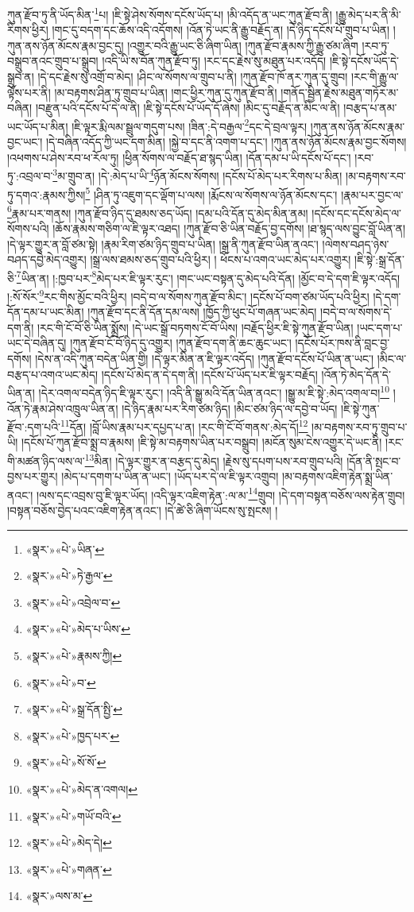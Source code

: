 ཀུན་རྫོབ་ཏུ་ནི་ཡོད་མིན་\footnote{«སྣར་»«པེ་»ཡིན་}པ། །ཇི་སྟེ་ཤེས་སོགས་དངོས་ཡོད་པ། །མི་འདོད་ན་ཡང་ཀུན་རྫོབ་ནི། །རྒྱུ་མེད་པར་ནི་མི་རིགས་ཕྱིར། །གང་དུ་བདག་དང་ཆོས་འདི་འདོགས། །འོན་ཏེ་ཡང་ནི་རྒྱུ་བརྗོད་ན། །དེ་ཉིད་དངོས་པོ་གྲུབ་པ་ཡིན། །ཀུན་ནས་ཉོན་མོངས་རྣམ་བྱང་དུ། །འགྱུར་བའི་རྒྱུ་ཡང་ཅི་ཞིག་ཡིན། །ཀུན་རྫོབ་རྣམས་ཀྱི་རྒྱུ་ཙམ་ཞིག །རབ་ཏུ་བསྒྲུབ་ནའང་གྲུབ་པ་སྒྲུབ། །འདི་ཡི་ས་བོན་ཀུན་རྫོབ་ཏུ། །རང་དང་རྗེས་སུ་མཐུན་པར་འདོད། །ཇི་སྟེ་དངོས་ཡོད་དེ་སྒྲུབ་ན། །དེ་དང་རྗེས་སུ་འགྲོ་བ་མེད། །ཤིང་ལ་སོགས་ལ་གྲུབ་པ་ནི། །ཀུན་རྫོབ་ཁོ་ནར་ཀུན་དུ་གྲུབ། །རང་གི་རྒྱུ་ལ་ལྟོས་པར་ནི། །མ་བརྟགས་ཤིན་ཏུ་གྲུབ་པ་ཡིན། །གང་ཕྱིར་ཀུན་དུ་ཀུན་རྫོབ་ནི། །གནོད་སྦྱིན་རྗེས་མཐུན་གཏོར་མ་བཞིན། །བརྫུན་པའི་དངོས་པོ་དེ་ལ་ནི། །ཇི་སྟེ་དངོས་པོ་ཡོད་དོ་ཞེས། །མིང་དུ་བརྗོད་ན་མིང་ལ་ནི། །བརྩད་པ་ནམ་ཡང་ཡོད་པ་མིན། །ཇི་ལྟར་རྨི་ལམ་སྦྲུལ་གདུག་པས། །ཟིན་:དེ་བརྒྱལ་\footnote{«སྣར་»«པེ་»ཏེ་རྒྱལ་}དང་དེ་བྲལ་ལྟར། །ཀུན་ནས་ཉོན་མོངས་རྣམ་བྱང་ཡང་། །དེ་བཞིན་འདོད་ཀྱི་ཡང་དག་མིན། །སྐྱེ་བ་དང་ནི་འགག་པ་དང་། །ཀུན་ནས་ཉོན་མོངས་རྣམ་བྱང་སོགས། །འཕགས་པ་ཤེས་རབ་ཕ་རོལ་ཏུ། །ཕྱིན་སོགས་ལ་བརྗོད་ཐ་སྙད་ཡིན། །དོན་དམ་པ་ཡི་དངོས་པོ་དང་། །རབ་ཏུ་:འབྲལ་བ་\footnote{«སྣར་»«པེ་»འབྲེལ་བ་}མ་གྲུབ་ན། །དེ་:མེད་པ་ཡི་\footnote{«སྣར་»«པེ་»མེད་པ་ཡིས་}ཉོན་མོངས་སོགས། །དངོས་པོ་མེད་པར་རིགས་པ་མིན། །མ་བརྟགས་རབ་ཏུ་དགའ་:རྣམས་ཀྱིས།\footnote{«སྣར་»«པེ་»རྣམས་ཀྱི།} །ཤིན་ཏུ་འཇུག་དང་ལྡོག་པ་ལས། །རྨོངས་ལ་སོགས་ལ་ཉོན་མོངས་དང་། །རྣམ་པར་བྱང་ལ་\footnote{«སྣར་»«པེ་»བ་}རྣམ་པར་གནས། །ཀུན་རྫོབ་ཉིད་དུ་ཐམས་ཅད་ཡོད། །དམ་པའི་དོན་དུ་མེད་མིན་ནམ། །དངོས་དང་དངོས་མེད་ལ་སོགས་པའི། །ཆོས་རྣམས་གཅིག་ལ་ཇི་ལྟར་འཐད། །ཀུན་རྫོབ་ཅི་ཡིན་བརྗོད་བྱ་དགོས། །ཐ་སྙད་ལས་བྱུང་བློ་ཡིན་ན། །དེ་ལྟར་གྱུར་ན་བློ་ཙམ་སྟེ། །རྣམ་རིག་ཙམ་ཉིད་གྲུབ་པ་ཡིན། །སྒྲ་ནི་ཀུན་རྫོབ་ཡིན་ནའང་། །ལེགས་བཤད་ཉེས་བཤད་དབྱེ་མེད་འགྱུར། །སྒྲ་ལས་ཐམས་ཅད་གྲུབ་པའི་ཕྱིར། །
ཕོངས་པ་འགའ་ཡང་མེད་པར་འགྱུར། །ཇི་སྟེ་:སྒྲ་དོན་ཅི་\footnote{«སྣར་»«པེ་»སྒྲ་དོན་སྤྱི་}ཡིན་ན། །:ཁྱབ་པར་\footnote{«སྣར་»«པེ་»ཁྱད་པར་}མེད་པར་ཇི་ལྟར་རུང་། །གང་ཡང་བསྟན་དུ་མེད་པའི་དོན། །མྱོང་བ་དེ་དག་ཇི་ལྟར་འདོད། །:སོ་སོར་\footnote{«སྣར་»«པེ་»སོ་སོ་}རང་གིས་མྱོང་བའི་ཕྱིར། །བདེ་བ་ལ་སོགས་ཀུན་རྫོབ་མིང་། །དངོས་པོ་བག་ཙམ་ཡོད་པའི་ཕྱིར། །དེ་དག་དོན་དམ་པ་ཡང་མིན། །ཀུན་རྫོབ་དང་ནི་དོན་དམ་ལས། །ཁྱོད་ཀྱི་ཕུང་པོ་གཞན་ཡང་མེད། །བདེ་བ་ལ་སོགས་དེ་དག་ནི། །རང་གི་ངོ་བོ་ཅི་ཡིན་སྨྲོས། །དེ་ཡང་སྒྲོ་བཏགས་ངོ་བོ་ཡིས། །བརྗོད་ཕྱིར་ཇི་སྟེ་ཀུན་རྫོབ་ཡིན། །ཡང་དག་པ་ཡང་དེ་བཞིན་དུ། །ཀུན་རྫོབ་ངོ་བོ་ཉིད་དུ་འགྱུར། །ཀུན་རྫོབ་དག་ནི་ཆང་ཆུང་ཡང་། །དངོས་པོར་ཁས་ནི་བླང་བྱ་དགོས། །དེས་ན་འདི་ཀུན་བདེན་ཡིན་གྱི། །དེ་ལྟར་མིན་ན་ཇི་ལྟར་འདོད། །ཀུན་རྫོབ་དངོས་པོ་ཡིན་ན་ཡང་། །མིང་ལ་བརྩད་པ་འགའ་ཡང་མེད། །དངོས་པོ་མེད་ན་དེ་དག་ནི། །དངོས་པོ་ཡོད་པར་ཇི་ལྟར་བརྗོད། །འོན་ཏེ་མེད་དོན་དེ་ཡིན་ན། །དེར་འགལ་བདེན་ཉིད་ཇི་ལྟར་རུང་། །འདི་ནི་སྒྱུ་མའི་དོན་ཡིན་ནའང་། །སྒྱུ་མ་ཇི་སྟེ་:མེད་འགལ་བ།\footnote{«སྣར་»«པེ་»མེད་ན་འགལ།} །འོན་ཏེ་རྣམ་ཤེས་འཁྲུལ་ཡིན་ན། །དེ་ཉིད་རྣམ་པར་རིག་ཙམ་ཉིད། །མིང་ཙམ་ཉིད་ལ་དབྱེ་བ་ཡོད། །ཇི་སྟེ་ཀུན་རྫོབ་:དག་པའི་\footnote{«སྣར་»«པེ་»གཡོ་བའི་}དོན། །བློ་ཡིས་རྣམ་པར་དཔྱད་པ་ན། །རང་གི་ངོ་བོ་གནས་:མེད་དོ།\footnote{«སྣར་»«པེ་»མེད་དེ།} །མ་བརྟགས་རབ་ཏུ་གྲུབ་པ་ཡི། །དངོས་པོ་ཀུན་རྫོབ་སྨྲ་བ་རྣམས། །ཇི་སྟེ་མ་བརྟགས་ཡིན་པར་བསྒྲུབ། །མངོན་སུམ་ངེས་འགྱུར་དེ་ཡང་ནི། །རང་གི་མཚན་ཉིད་ལས་ལ་\footnote{«སྣར་»«པེ་»གཞན་}མིན། །དེ་ལྟར་གྱུར་ན་བརྩད་དུ་མེད། །རྗེས་སུ་དཔག་པས་རབ་གྲུབ་པའི། །དོན་ནི་སྤང་བ་བྱས་པར་གྱུར། །མེད་པ་དགག་པ་ཡིན་ན་ཡང་། །ཡོད་པར་དེ་ལ་ཇི་ལྟར་འགྲུབ། །མ་བརྟགས་འཇིག་རྟེན་སྨྲ་ཡིན་ནའང་། །ལས་དང་འབྲས་བུ་ཇི་ལྟར་ཡོད། །འདི་ལྟར་འཇིག་རྟེན་:ལ་མ་\footnote{«སྣར་»ལས་མ་}གྲུབ། །དེ་དག་བསྟན་བཅོས་ལས་རྟེན་གྲུབ། །བསྟན་བཅོས་བྱེད་པའང་འཇིག་རྟེན་ནའང་། །དེ་ཚེ་ཅི་ཞིག་ཡོངས་སུ་སྤངས། །
